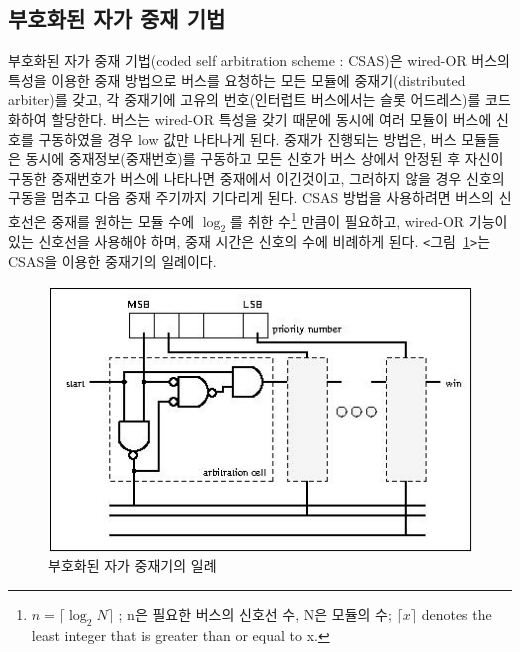 \subsection{부호화된 자가 중재 기법}
부호화된 자가 중재 기법(coded self arbitration scheme : CSAS)은
wired-OR 버스의 특성을 이용한 중재 방법으로
버스를 요청하는 모든 모듈에 중재기(distributed arbiter)를 갖고, 
각 중재기에 고유의 번호(인터럽트 버스에서는 슬롯 어드레스)를 코드화하여 할당한다.
버스는 wired-OR 특성을 갖기 때문에  동시에 여러 모듈이 버스에 신호를 구동하였을 경우
low 값만 나타나게 된다. 중재가 진행되는 방법은, 버스 모듈들은 동시에 중재정보(중재번호)를
구동하고 모든 신호가 버스 상에서 안정된 후 자신이 구동한 중재번호가 버스에 나타나면 중재에서 이긴것이고,
그러하지 않을 경우 신호의 구동을 멈추고 다음 중재 주기까지 기다리게 된다.
CSAS 방법을 사용하려면 버스의 신호선은 중재를 원하는 모듈 수에
$\log_{2}$를 취한 수\footnote{$n = \lceil \log_{2} N \rceil$ ; n은 필요한 버스의 신호선 수,
N은 모듈의 수; $\lceil x \rceil$ denotes the least integer that is
greater than or equal to x.}
만큼이 필요하고, wired-OR 기능이 있는 신호선을 사용해야 하며,
중재 시간은 신호의 수에 비례하게 된다.
{\tt <}그림~\ref{figure:csa}{\tt >}는 CSAS을 이용한 중재기의
일례이다.
%
\begin{figure}[hp]
    \centerline{\includegraphics{ch4/FIG/int-arbiter.jpg}}
   \caption{부호화된 자가 중재기의 일례}\label{figure:csa}
\end{figure}
%
%
